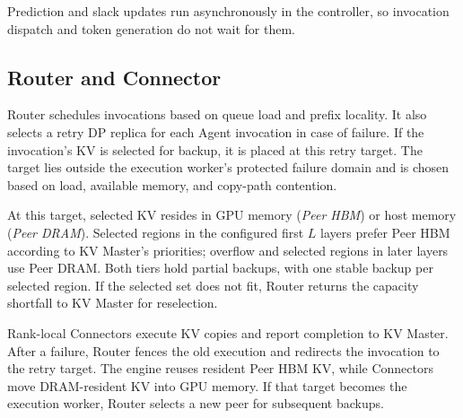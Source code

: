 Prediction and slack updates run asynchronously in the controller, so
invocation dispatch and token generation do not wait for them.

\subsection{Router and Connector}
\label{sec:router}

Router schedules invocations based on queue load and prefix locality.
It also selects a retry DP replica for each Agent invocation in case of
failure. If the invocation's KV is selected for backup, it is placed at
this retry target. The target lies outside the execution worker's
protected failure domain and is chosen based on load, available memory,
and copy-path contention.

At this target, selected KV resides in GPU memory (\emph{Peer HBM}) or
host memory (\emph{Peer DRAM}). Selected regions in the configured first
$L$ layers prefer Peer HBM according to KV Master's priorities; overflow
and selected regions in later layers use Peer DRAM. Both tiers hold
partial backups, with one stable backup per selected region.
If the selected set does not fit, Router returns the capacity shortfall
to KV Master for reselection.

Rank-local Connectors execute KV copies and report completion to KV
Master. After a failure, Router fences the old execution and redirects
the invocation to the retry target. The engine reuses resident Peer HBM
KV, while Connectors move DRAM-resident KV into GPU memory.
If that target becomes the execution worker, Router selects a new peer
for subsequent backups.

